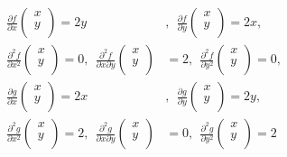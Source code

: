 \documentclass[dvipdfmx]{jsarticle}
\begin{document}
\begin{align*}
\frac{\partial f}{\partial x}\begin{pmatrix}
x \\
y \\
\end{pmatrix} = 2y&,\ \ \frac{\partial f}{\partial y}\begin{pmatrix}
x \\
y \\
\end{pmatrix} = 2x,\\
\frac{\partial^{2}f}{\partial x^{2}}\begin{pmatrix}
x \\
y \\
\end{pmatrix} = 0,\ \ \frac{\partial^{2}f}{\partial x\partial y}\begin{pmatrix}
x \\
y \\
\end{pmatrix} &= 2,\ \ \frac{\partial^{2}f}{\partial y^{2}}\begin{pmatrix}
x \\
y \\
\end{pmatrix} = 0,\\
\frac{\partial g}{\partial x}\begin{pmatrix}
x \\
y \\
\end{pmatrix} = 2x&,\ \ \frac{\partial g}{\partial y}\begin{pmatrix}
x \\
y \\
\end{pmatrix} = 2y,\\
\frac{\partial^{2}g}{\partial x^{2}}\begin{pmatrix}
x \\
y \\
\end{pmatrix} = 2,\ \ \frac{\partial^{2}g}{\partial x\partial y}\begin{pmatrix}
x \\
y \\
\end{pmatrix} &= 0,\ \ \frac{\partial^{2}g}{\partial y^{2}}\begin{pmatrix}
x \\
y \\
\end{pmatrix} = 2
\end{align*}
\end{document}
